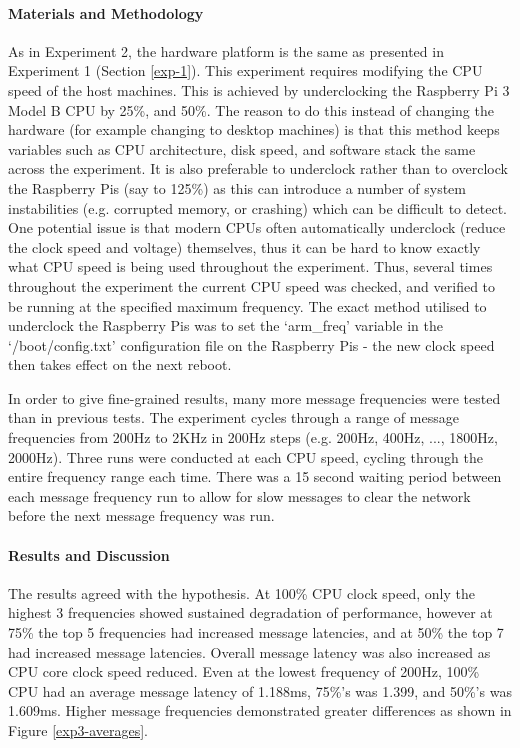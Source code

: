 \documentclass[../dissertation.tex]{subfiles}
\begin{document}
\paragraph{Materials and Methodology} As in Experiment 2, the hardware platform is the same as presented in Experiment 1 (Section \ref{exp-1}). This experiment requires modifying the CPU speed of the host machines. This is achieved by underclocking the Raspberry Pi 3 Model B CPU by 25\%, and 50\%. The reason to do this instead of changing the hardware (for example changing to desktop machines) is that this method keeps variables such as CPU architecture, disk speed, and software stack the same across the experiment. It is also preferable to underclock rather than to overclock the Raspberry Pis (say to 125\%) as this can introduce a number of system instabilities (e.g. corrupted memory, or crashing) which can be difficult to detect. One potential issue is that modern CPUs often automatically underclock (reduce the clock speed and voltage) themselves, thus it can be hard to know exactly what CPU speed is being used throughout the experiment. Thus, several times throughout the experiment the current CPU speed was checked, and verified to be running at the specified maximum frequency. The exact method utilised to underclock the Raspberry Pis was to set the `arm\_freq' variable in the `/boot/config.txt' configuration file on the Raspberry Pis - the new clock speed then takes effect on the next reboot.

In order to give fine-grained results, many more message frequencies were tested than in previous tests. The experiment cycles through a range of message frequencies from 200Hz to 2KHz in 200Hz steps (e.g. 200Hz, 400Hz, ..., 1800Hz, 2000Hz). Three runs were conducted at each CPU speed, cycling through the entire frequency range each time. There was a 15 second waiting period between each message frequency run to allow for slow messages to clear the network before the next message frequency was run.

\paragraph{Results and Discussion} The results agreed with the hypothesis. At 100\% CPU clock speed, only the highest 3 frequencies showed sustained degradation of performance, however at 75\% the top 5 frequencies had increased message latencies, and at 50\% the top 7 had increased message latencies. Overall message latency was also increased as CPU core clock speed reduced. Even at the lowest frequency of 200Hz, 100\% CPU had an average message latency of 1.188ms, 75\%'s was 1.399, and 50\%'s was 1.609ms. Higher message frequencies demonstrated greater differences as shown in Figure \ref{exp3-averages}.
\end{document}
